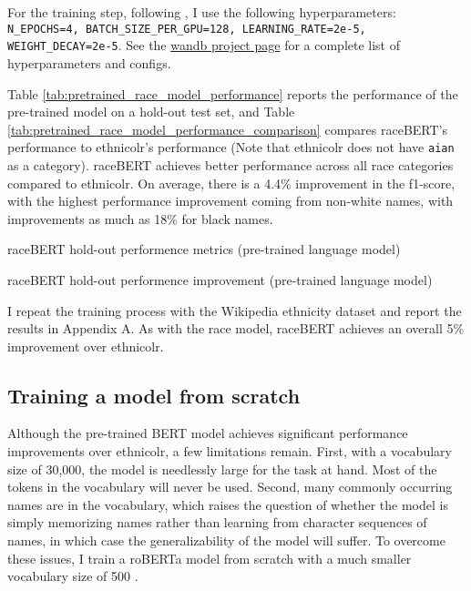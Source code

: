 \documentclass[11pt]{article}
\begin{document}
For the training step, following \textcite{sun_how_2019}, I use the following hyperparameters: \texttt{N\_EPOCHS=4, BATCH\_SIZE\_PER\_GPU=128, LEARNING\_RATE=2e-5, WEIGHT\_DECAY=2e-5}. 
See the \href{https://wandb.ai/parasu/raceBERT-public/runs/39jr1hrc/overview}{wandb project page} for a complete list of hyperparameters and configs. 

Table \ref{tab:pretrained_race_model_performance} reports the performance of the pre-trained model on a hold-out test set, and Table \ref{tab:pretrained_race_model_performance_comparison} compares raceBERT's performance to ethnicolr's performance (Note that ethnicolr does not have \texttt{aian} as a category). 
raceBERT achieves better performance across all race categories compared to ethnicolr.
On average, there is a 4.4\% improvement in the f1-score, with the highest performance improvement coming from non-white names, with improvements as much as 18\% for black names.

\begin{table}[H]
 \centering
 
 \caption{raceBERT hold-out performence metrics (pre-trained language model)}
 \label{tab:pretrained_race_model_performance}
\end{table}

\begin{table}[H]
 \centering
 
 \caption{raceBERT hold-out performence improvement (pre-trained language model)}
 \label{tab:pretrained_race_model_performance_comparison}
\end{table}

I repeat the training process with the Wikipedia ethnicity dataset \parencite{ambekar_name-ethnicity_2009,sood_predicting_2018} and report the results in Appendix A. 
As with the race model, raceBERT achieves an overall 5\% improvement over ethnicolr. 

\subsection{Training a model from scratch}

Although the pre-trained BERT model achieves significant performance improvements over ethnicolr, a few limitations remain.
First, with a vocabulary size of 30,000, the model is needlessly large for the task at hand. 
Most of the tokens in the vocabulary will never be used.
Second, many commonly occurring names are in the vocabulary, which raises the question of whether the model is simply memorizing names rather than learning from character sequences of names, in which case the generalizability of the model will suffer. 
To overcome these issues, I train a roBERTa model from scratch with a much smaller vocabulary size of 500 \parencite{liu_roberta_2019}. 
\end{document}
